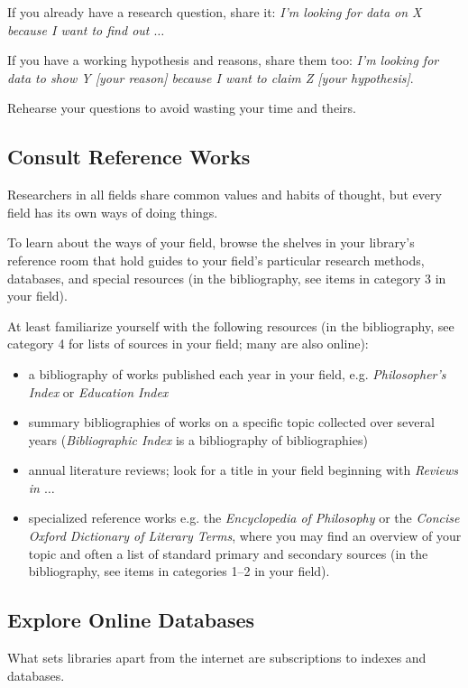 \documentclass[oneside]{book}
\numberwithin{equation}{section}
\begin{document}
If you already have a research question, share it: \textit{I'm looking for data on X because I want to find out $\ldots$}

If you have a working hypothesis and reasons, share them too: \textit{I'm looking for data to show Y [your reason] because I want to claim Z [your hypothesis]}.

Rehearse your questions to avoid wasting your time and theirs.

\subsection{Consult Reference Works}
Researchers in all fields share common values and habits of thought, but every field has its own ways of doing things.

To learn about the ways of your field, browse the shelves in your library's reference room that hold guides to your field's particular research methods, databases, and special resources (in the bibliography, see items in category 3 in your field).

At least familiarize yourself with the following resources (in the bibliography, see category 4 for lists of sources in your field; many are also online):
\begin{itemize}
    \item a bibliography of works published each year in your field, e.g. \textit{Philosopher's Index} or \textit{Education Index}
    \item summary bibliographies of works on a specific topic collected over several years (\textit{Bibliographic Index} is a bibliography of bibliographies)
    \item annual literature reviews; look for a title in your field beginning with \textit{Reviews in $\ldots$}
    \item specialized reference works e.g. the \textit{Encyclopedia of Philosophy} or the \textit{Concise Oxford Dictionary of Literary Terms}, where you may find an overview of your topic and often a list of standard primary and secondary sources (in the bibliography, see items in categories 1--2 in your field).
\end{itemize}

\subsection{Explore Online Databases}
What sets libraries apart from the internet are subscriptions to indexes and databases.
\end{document}
